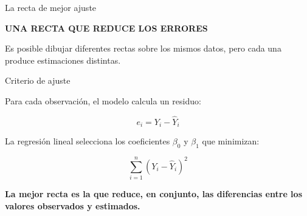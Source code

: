 \documentclass[aspectratio=169,11pt]{beamer}
\newcommand{\kicker}[1]{%
  {\scriptsize\bfseries\color{cAcc}\MakeUppercase{#1}}%
  \par\vspace{0.2em}%
}
\newcommand{\destaca}[1]{%
  {\color{cPrim}\bfseries #1}%
}
\newenvironment{cerrado}[1]
  {\begin{block}{#1}
   \begin{minipage}{\linewidth}
   \raggedright}
  {\end{minipage}
   \end{block}}
\begin{document}
\begin{frame}{La recta de mejor ajuste}

  \begin{center}
    \begin{minipage}{0.84\textwidth}

      \kicker{UNA RECTA QUE REDUCE LOS ERRORES}

      Es posible dibujar diferentes rectas sobre los mismos datos,
      pero cada una produce estimaciones distintas.

      \vspace{0.3em}

      \begin{cerrado}{Criterio de ajuste}

        Para cada observación, el modelo calcula un residuo:

        \[
          e_i=Y_i-\hat{Y}_i
        \]

        La regresión lineal selecciona los coeficientes
        \(\beta_0\) y \(\beta_1\) que minimizan:

        \[
          \sum_{i=1}^{n}\left(Y_i-\hat{Y}_i\right)^2
        \]

        \vspace{0.15em}

        \destaca{La mejor recta es la que reduce, en conjunto,
        las diferencias entre los valores observados y estimados.}

      \end{cerrado}

    \end{minipage}
  \end{center}

\end{frame}
\end{document}
